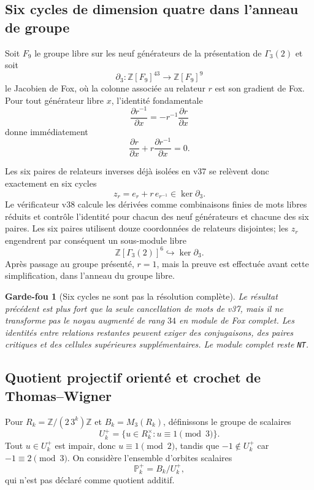 \documentclass[11pt,a4paper]{article}
\newtheorem{guardrail}[theorem]{Garde-fou}
\newcommand{\certNT}{\texttt{NT}}
\begin{document}
\subsection{Six cycles de dimension quatre dans l'anneau de groupe}

Soit $F_9$ le groupe libre sur les neuf générateurs de la présentation de $\Gamma_3(2)$ et soit
\[
 \partial_3:\mathbb Z[F_9]^{43}\longrightarrow\mathbb Z[F_9]^9
\]
le Jacobien de Fox, où la colonne associée au relateur $r$ est son gradient de Fox. Pour tout générateur libre $x$, l'identité fondamentale
\[
 \frac{\partial r^{-1}}{\partial x}
 =-r^{-1}\frac{\partial r}{\partial x}
\]
donne immédiatement
\[
 \frac{\partial r}{\partial x}
 +r\frac{\partial r^{-1}}{\partial x}=0.
\]

Les six paires de relateurs inverses déjà isolées en v37 se relèvent donc exactement en six cycles
\[
 z_r=e_r+r\,e_{r^{-1}}\in\ker\partial_3.
\]
Le vérificateur v38 calcule les dérivées comme combinaisons finies de mots libres réduits et contrôle l'identité pour chacun des neuf générateurs et chacune des six paires. Les six paires utilisent douze coordonnées de relateurs disjointes; les $z_r$ engendrent par conséquent un sous-module libre
\[
 \boxed{\mathbb Z[\Gamma_3(2)]^{6}\hookrightarrow\ker\partial_3}.
\]
Après passage au groupe présenté, $r=1$, mais la preuve est effectuée avant cette simplification, dans l'anneau du groupe libre.

\begin{guardrail}[Six cycles ne sont pas la résolution complète]
Le résultat précédent est plus fort que la seule cancellation de mots de v37, mais il ne transforme pas le noyau augmenté de rang $34$ en module de Fox complet. Les identités entre relations restantes peuvent exiger des conjugaisons, des paires critiques et des cellules supérieures supplémentaires. Le module complet reste \certNT{}.
\end{guardrail}

\subsection{Quotient projectif orienté et crochet de Thomas--Wigner}

Pour $R_k=\mathbb Z/(2\,3^k)\mathbb Z$ et $B_k=M_3(R_k)$, définissons le groupe de scalaires
\[
 U_k^+=\{u\in R_k^\times: u\equiv1\pmod3\}.
\]
Tout $u\in U_k^+$ est impair, donc $u\equiv1\pmod2$, tandis que $-1\notin U_k^+$ car $-1\equiv2\pmod3$. On considère l'ensemble d'orbites scalaires
\[
 \mathbb P_k^+=B_k/U_k^+,
\]
qui n'est pas déclaré comme quotient additif.
\end{document}
